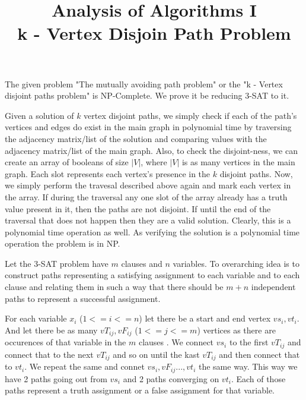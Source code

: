 \documentclass{imports}
\title{\textbf{Analysis of Algorithms I}\\ k - Vertex Disjoin Path Problem}
\author{}
\date{}
\begin{document}
\maketitle
\allowdisplaybreaks %

    The given problem "The mutually avoiding path problem" or the "k - Vertex disjoint paths problem" is NP-Complete.
    We prove it be reducing 3-SAT to it. \cite{kddmain} \cite{stackoverflowkdd} \vspace{10pt}

    Given a solution of $k$ vertex disjoint paths, we simply check if each of the path's vertices and edges do exist in the main graph
    in polynomial time by traversing the adjacency matrix/list of the solution and comparing values with the adjacency matrix/list of the main graph.
    Also, to check the disjoint-ness, we can create an array of booleans of size $|V|$, where $|V|$ is as many vertices in the main graph. Each slot represents each vertex's presence
    in the $k$ disjoint paths. Now, we simply perform the travesal described above again and mark each vertex in the array. If during the traversal
    any one slot of the array already has a truth value present in it, then the paths are not disjoint. If until the end of the traversal that does not
    happen then they are a valid solution. Clearly, this is a polynomial time operation as well. As verifying the solution is a polynomial time
    operation the problem is in NP. \vspace{10pt}

    Let the 3-SAT problem have $m$ clauses and $n$ variables. To overarching idea is to construct paths representing
    a satisfying assignment to each variable and to each clause and relating them in such a way that there should be $m+n$
    independent paths to represent a successful assignment. \vspace{10pt}
    
    For each variable $x_i$ ($1<=i<=n$) let there be a start and end vertex $vs_i, vt_i$. And let there be as many $vT_{ij}, vF_{ij}$
    ($1<=j<=m$) vertices as there are occurences of that variable in the $m$ clauses . We connect $vs_i$ to the first $vT_{ij}$ and connect
    that to the next $vT_{ij}$ and so on until the kast $vT_{ij}$ and then connect that to $vt_i$. We repeat the same and connet $vs_i, vF_{ij}..., vt_i$
    the same way. This way we have 2 paths going out from $vs_i$ and 2 paths converging on $vt_i$. Each of those paths represent a truth assignment
    or a false assignment for that variable. \vspace{10pt}
\end{document}
